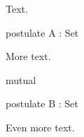 \documentclass{article}
\begin{document}
\noindent Text.
\begin{code}
    postulate A : Set
\end{code}
More text.
\begin{AgdaMultiCode}
\begin{code}
  mutual
\end{code}
\begin{code}
    postulate B : Set
\end{code}
\end{AgdaMultiCode}
Even more text.
\end{document}
